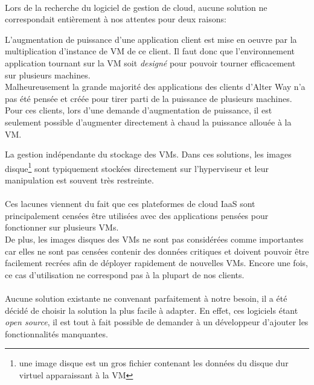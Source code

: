 \paragraph*{}
\label{cloudissues}
Lors de la recherche du logiciel de gestion de cloud, aucune solution ne correspondait entièrement à nos attentes pour deux raisons:
\begin{listi}
	\item L'augmentation de puissance d'une application client est mise en oeuvre par la multiplication d'instance de VM de ce client.
		Il faut donc que l'environnement application tournant sur la VM soit \textsl{designé} pour pouvoir tourner efficacement sur
		plusieurs machines.\\
		Malheureusement la grande majorité des applications des clients d'Alter Way n'a pas été pensée et créée pour tirer parti de la
		puissance de plusieurs machines.\\
		Pour ces clients, lors d'une demande d'augmentation de puissance, il est seulement possible d'augmenter directement à chaud
		la puissance allouée à la VM.

	\item La gestion indépendante du stockage des VMs. Dans ces solutions, les images disque\footnote{une image disque est un gros fichier contenant les données
	du disque dur virtuel apparaissant à la VM} sont typiquement stockées directement sur l'hyperviseur et leur manipulation est souvent très restreinte.
\end{listi}

\paragraph*{}
Ces lacunes viennent du fait que ces plateformes de cloud IaaS sont principalement censées être utilisées avec des applications pensées pour fonctionner sur plusieurs VMs. \\
De plus, les images disques des VMs ne sont pas considérées comme importantes car elles ne sont pas censées contenir des données critiques et doivent pouvoir être facilement
recrées afin de déployer rapidement de nouvelles VMs. Encore une fois, ce cas d'utilisation ne correspond pas à la plupart de nos clients.

\paragraph*{}
Aucune solution existante ne convenant parfaitement à notre besoin, il a été décidé de choisir la solution la plus facile à adapter.
En effet, ces logiciels étant \emph{open source}, il est tout à fait possible de demander à un développeur d'ajouter les fonctionnalités manquantes.

